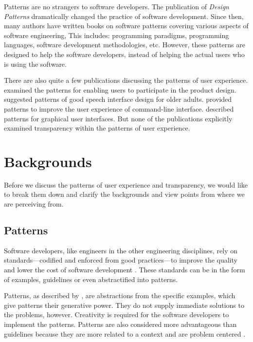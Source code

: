 \documentclass[a4paper,titlepage]{article}
\begin{document}
Patterns are no strangers to software developers. The publication of
\textit{Design Patterns} \citep{patterns:gamma} dramatically changed
the practice of software development. Since then, many authors have
written books on software patterns covering various aspects of
software engineering, This includes: programming paradigms,
programming languages, software development methodologies,
etc. However, these patterns are designed to help the software
developers, instead of helping the actual users who is using the
software.

There are also quite a few publications discussing the patterns of
user experience. \citet{participatory:dearden} examined the patterns
for enabling users to participate in the product design.
\citet{speech:zajicek} suggested patterns of good speech interface
design for older adults. \citet{unix:raymond} provided patterns to
improve the user experience of command-line interface.
\citet{patterns:tidwell} described patterns for graphical user
interfaces. But none of the publications explicitly examined
transparency within the patterns of user experience.


\section{Backgrounds}
\label{sec:backgrounds}
Before we discuss the patterns of user experience and transparency, we
would like to break them down and clarify the backgrounds and view
points from where we are perceiving from.

\subsection{Patterns}
Software developers, like engineers in the other engineering
disciplines, rely on standards---codified and enforced from good
practices---to improve the quality and lower the cost of software
development \citep{practice:ipenz}. These standards can be in the form
of examples, guidelines or even abstractified into patterns.

Patterns, as described by \citet{patterns:griffiths}, are abstractions
from the specific examples, which give patterns their generative
power. They do not supply immediate solutions to the problems,
however. Creativity is required for the software developers to
implement the patterns. Patterns are also considered more advantageous
than guidelines because they are more related to a context and are
problem centered \citep{patterns:welie}.
\end{document}
